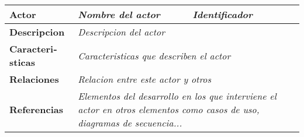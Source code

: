 \begin{tabular}{l|l|p{5cm}}
    \textbf{Actor} & \textit{Nombre del actor} & \textit{Identificador} \\ \hline
    \textbf{Descripcion} & \multicolumn{2}{l}{\textit{Descripcion del actor}} \\ \hline
    \textbf{Caracteri­sticas} & \multicolumn{2}{l}{\textit{Caracteri­sticas que describen el actor}} \\ \hline
    \textbf{Relaciones} & \multicolumn{2}{l}{\textit{Relacion entre este actor y otros}} \\ \hline
    \textbf{Referencias} & \multicolumn{2}{p{10cm}}{\textit{Elementos del desarrollo en los que interviene el actor en otros elementos como casos de uso, diagramas de secuencia...}} \\
\end{tabular}
